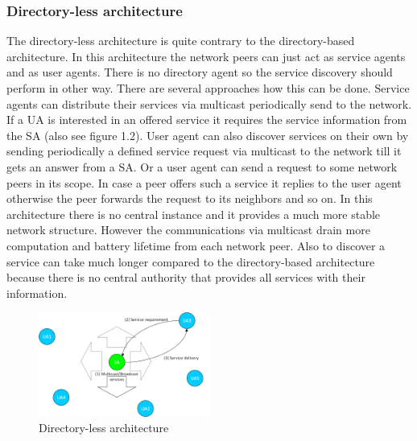 \subsubsection{Directory-less architecture}
The directory-less architecture is quite contrary to the directory-based architecture. In this architecture the network peers can just act as service agents and as user agents. There is no directory agent so the service discovery should perform in other way. There are several approaches how this can be done. Service agents can distribute their services via multicast periodically send to the network. If a UA is interested in an offered service it requires the service information from the SA (also see figure 1.2). User agent can also discover services on their own by sending periodically a defined service request via multicast to the network till it gets an answer from a SA. Or a user agent can send a request to some network peers in its scope. In case a peer offers such a service it replies to the user agent otherwise the peer forwards the request to its neighbors and so on. In this architecture there is no central instance and it provides a much more stable network structure. However the communications via multicast drain more computation and battery lifetime from each network peer. Also to discover a service can take much longer compared to the directory-based architecture because there is no central authority that provides all services with their information.

\begin{figure}[h]
\centering\includegraphics[width=0.5\textwidth]{Images/directory-less_architecture}
\caption{Directory-less architecture}
\end{figure}\noindent


